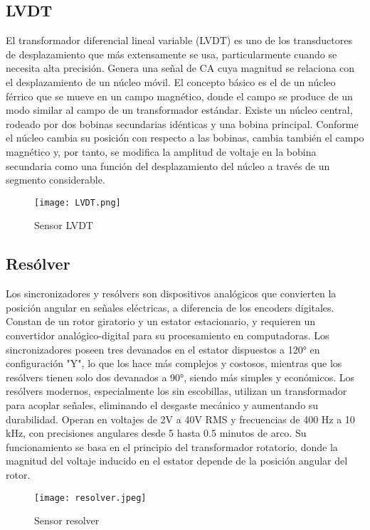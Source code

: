 \subsection*{\quad\textbf{LVDT}}
El transformador diferencial lineal variable (LVDT) es uno de los transductores de desplazamiento que más extensamente se usa, particularmente cuando se necesita alta precisión. Genera una señal de CA cuya magnitud se relaciona con el desplazamiento de un núcleo móvil. El concepto básico es el de un núcleo férrico que se mueve en un campo magnético, donde el campo se produce de un modo similar al campo de un transformador estándar. Existe un núcleo central, rodeado por dos bobinas secundarias idénticas y una bobina principal. Conforme el núcleo cambia su posición con respecto a las bobinas, cambia también el campo magnético y, por tanto, se modifica la amplitud de voltaje en la bobina secundaria como una función del desplazamiento del núcleo a través de un segmento considerable.
\begin{figure}[h]
	\centering
	\texttt{[image: LVDT.png]} %
	\caption{Sensor LVDT}
	\label{fig:ejemplo3}
\end{figure}
\vspace{2cm}

\subsection*{\quad\textbf{Resólver}}
Los sincronizadores y resólvers son dispositivos analógicos que convierten la posición angular en señales eléctricas, a diferencia de los encoders digitales. Constan de un rotor giratorio y un estator estacionario, y requieren un convertidor analógico-digital para su procesamiento en computadoras. Los sincronizadores poseen tres devanados en el estator dispuestos a 120° en configuración "Y", lo que los hace más complejos y costosos, mientras que los resólvers tienen solo dos devanados a 90°, siendo más simples y económicos. Los resólvers modernos, especialmente los sin escobillas, utilizan un transformador para acoplar señales, eliminando el desgaste mecánico y aumentando su durabilidad. Operan en voltajes de 2V a 40V RMS y frecuencias de 400 Hz a 10 kHz, con precisiones angulares desde 5 hasta 0.5 minutos de arco. Su funcionamiento se basa en el principio del transformador rotatorio, donde la magnitud del voltaje inducido en el estator depende de la posición angular del rotor.
\begin{figure}[h]
	\centering
	\texttt{[image: resolver.jpeg]} %
	\caption{Sensor resolver}
	\label{fig:ejemplo4}
\end{figure}

